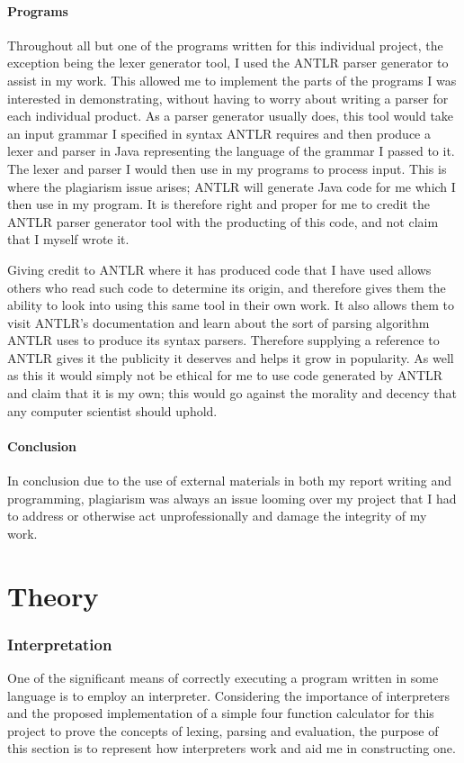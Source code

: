\documentclass[a4paper, 11pt]{article}
\begin{document}
\subsection{Programs}
Throughout all but one of the programs written for this individual project, the exception being the lexer generator tool, I used the ANTLR \cite{ANTLR} parser generator to assist in my work. This allowed me to implement the parts of the programs I was interested in demonstrating, without having to worry about writing a parser for each individual product. As a parser generator usually does, this tool would take an input grammar I specified in syntax ANTLR requires and then produce a lexer and parser in Java representing the language of the grammar I passed to it. The lexer and parser I would then use in my programs to process input. This is where the plagiarism issue arises; ANTLR will generate Java code for me which I then use in my program. It is therefore right and proper for me to credit the ANTLR parser generator tool with the producting of this code, and not claim that I myself wrote it. 

Giving credit to ANTLR where it has produced code that I have used allows others who read such code to determine its origin, and therefore gives them the ability to look into using this same tool in their own work. It also allows them to visit ANTLR's documentation and learn about the sort of parsing algorithm ANTLR uses to produce its syntax parsers. Therefore supplying a reference to ANTLR gives it the publicity it deserves and helps it grow in popularity. As well as this it would simply not be ethical for me to use code generated by ANTLR and claim that it is my own; this would go against the morality and decency that any computer scientist should uphold. 

\subsection{Conclusion}
In conclusion due to the use of external materials in both my report writing and programming, plagiarism was always an issue looming over my project that I had to address or otherwise act unprofessionally and damage the integrity of my work.

\newpage\part{Theory}
\section{Interpretation}
One of the significant means of correctly executing a program written in some language is to employ an interpreter. Considering the importance of interpreters and the proposed implementation of a simple four function calculator for this project to prove the concepts of lexing, parsing and evaluation, the purpose of this section is to represent how interpreters work and aid me in constructing one.
\end{document}
